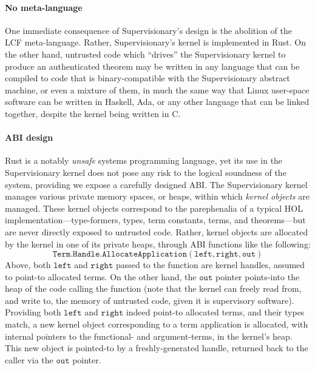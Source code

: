 \documentclass[sigplan, review]{acmart}
\begin{document}
\paragraph{No meta-language} One immediate consequence of Supervisionary's design is the abolition of the LCF meta-language.
Rather, Supervisionary's kernel is implemented in Rust.
On the other hand, untrusted code which ``drives'' the Supervisionary kernel to produce an authenticated theorem may be written in any language that can be compiled to code that is binary-compatible with the Supervisionary abstract machine, or even a mixture of them, in much the same way that Linux user-space software can be written in Haskell, Ada, or any other language that can be linked together, despite the kernel being written in C.

\paragraph{ABI design} Rust is a notably \emph{unsafe} systems programming language, yet its use in the Supervisionary kernel does not pose any risk to the logical soundness of the system, providing we expose a carefully designed ABI.
The Supervisionary kernel manages various private memory spaces, or heaps, within which \emph{kernel objects} are managed.
These kernel objects correspond to the parephenalia of a typical HOL implementation---type-formers, types, term constants, terms, and theorems---but are never directly exposed to untrusted code.
Rather, kernel objects are allocated by the kernel in one of its private heaps, through ABI functions like the following:
\begin{displaymath}
\mathtt{Term.Handle.AllocateApplication(left, right, out)}
\end{displaymath}
Above, both $\mathtt{left}$ and $\mathtt{right}$ passed to the function are kernel handles, assumed to point-to allocated terms.
On the other hand, the $\mathtt{out}$ pointer points-into the heap of the code calling the function (note that the kernel can freely read from, and write to, the memory of untrusted code, given it is supervisory software).
Providing both $\mathtt{left}$ and $\mathtt{right}$ indeed point-to allocated terms, and their types match, a new kernel object corresponding to a term application is allocated, with internal pointers to the functional- and argument-terms, in the kernel's heap.
This new object is pointed-to by a freshly-generated handle, returned back to the caller via the $\mathtt{out}$ pointer.
\end{document}
